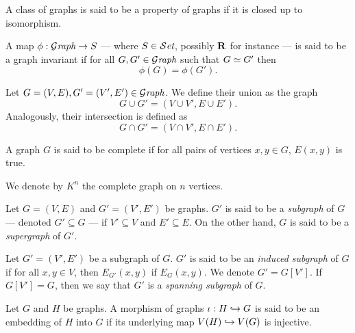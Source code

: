 \begin{definition}\label{def: graph-property}
  A class of graphs is said to be a property of graphs if it is closed up to
  isomorphism.
\end{definition}

\begin{definition}\label{def: graph-invariant}
  A map \(\phi: {\mathcal{G}\textit{raph}} \to S\) --- where \(S \in {\mathcal{S}\textit{et}}\), possibly \(\mathbf{R}\) for
  instance --- is said to be a graph invariant if for all \(G, G' \in
  {\mathcal{G}\textit{raph}}\) such that \(G \simeq G'\) then
  \[
    \phi(G) = \phi(G').
  \]
\end{definition}

\begin{definition}\label{def: union-intersection-gph}
  Let \(G = (V, E), G' = (V', E') \in {\mathcal{G}\textit{raph}}\). We define their union as the
  graph
  \[
    G \cup G' = (V \cup V', E \cup E').
  \]
  Analogously, their intersection is defined as
  \[
    G \cap G' = (V \cap V', E \cap E').
  \]
\end{definition}

\begin{definition}\label{def: complete-graph}
  A graph \(G\) is said to be complete if for all pairs of vertices \(x, y \in
  G\), \(E(x, y)\) is true.
\end{definition}

\begin{notation}
  We denote by \(K^n\) the complete graph on \(n\) vertices.
\end{notation}

\begin{definition}[Subgraph]
  Let \(G = (V, E)\) and \(G' = (V', E')\) be graphs. \(G'\) is said to be a
  \emph{subgraph} of \(G\) --- denoted \(G' \subseteq G\) --- if \(V' \subseteq
  V\) and \(E' \subseteq E\). On the other hand, \(G\) is said to be a
  \emph{supergraph} of \(G'\).
\end{definition}

\begin{definition}
  Let \(G' = (V', E')\) be a subgraph of \(G\). \(G'\) is said to be an
  \emph{induced subgraph} of \(G\) if for all \(x, y \in V\), then \(E_{G'}(x,
  y)\) if \(E_G(x, y)\). We denote \(G' = G[V']\). If \(G[V'] = G\), then we say
  that \(G'\) is a \emph{spanning subgraph} of \(G\).
\end{definition}

\begin{definition}\label{def: graph-embedding}
  Let \(G\) and \(H\) be graphs. A morphism of graphs \(\iota: H \hookrightarrow G\) is
  said to be an embedding of \(H\) into \(G\) if its underlying map \(V(H) \hookrightarrow
  V(G)\) is injective.
\end{definition}

